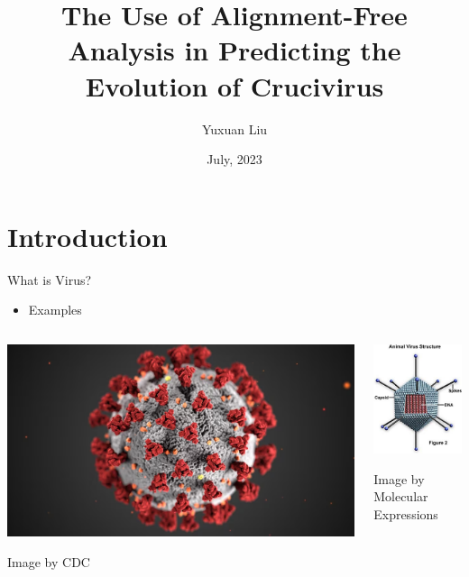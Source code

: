 \documentclass{beamer}
\title{The Use of Alignment-Free Analysis in Predicting the Evolution of Crucivirus}
\author{Yuxuan Liu}
\date{July, 2023}
\begin{document}
\maketitle

\section{Introduction}

\begin{frame}{What is Virus?}
    \begin{itemize}
        \item Examples
    \end{itemize}
    \begin{columns}
        \begin{column}{0.5\textwidth}
            \centering
            \includegraphics[scale = 0.18]{corona.png}
            
            Image by CDC
         \end{column}
         \begin{column}{0.5\textwidth}
         \centering
            \includegraphics[scale = 0.5]{virusStructure.png}

            Image by Molecular Expressions
         \end{column}
    \end{columns}
\end{frame}
\end{document}
